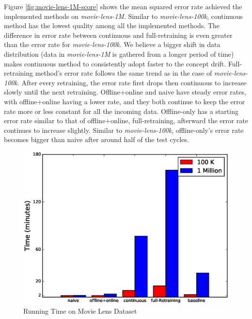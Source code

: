 \documentclass{sig-alternate-05-2015}
\begin{document}
Figure \ref{fig:movie-lens-1M-score} shows the mean squared error rate achieved the implemented methods on \textit{movie-lens-1M}.
Similar to \textit{movie-lens-100k}, continuous method has the lowest quality among all the implemented methods.
The difference in error rate between continuous and full-retraining is even greater than the error rate for \textit{movie-lens-100k}.
We believe a bigger shift in data distribution (data in \textit{movie-lens-1M} is gathered from a longer period of time) makes continuous method to consistently 
adopt faster to the concept drift.
Full-retraining method's error rate follows the same trend as in the case of \textit{movie-lens-100k}. 
After every retraining, the error rate first drops then continuous to increase slowly until the next retraining.
Offline+online and naive have steady error rates, with offline+online having a lower rate, and they both continue to keep the error rate more or less constant for all the incoming data.
Offline-only has a starting error rate similar to that of offline+online, full-retraining, afterward the error rate continues to increase slightly.
Similar to \textit{movie-lens-100k}, offline-only's error rate becomes bigger than naive after around half of the test cycles.



\begin{figure}[!ht]
\centering
\includegraphics[width=\columnwidth]{../images/experiment-results/movie-lens-time.eps}
\caption{Running Time on Movie Lens Dataset}
\label{fig:movie-lens-running-time}
\end{figure}
\end{document}
